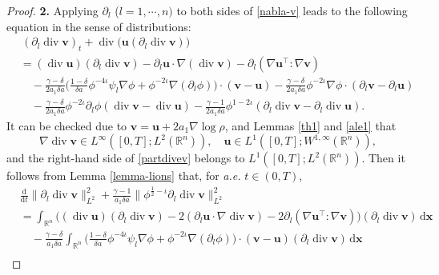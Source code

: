 \documentclass[11pt,reqno]{amsart}
\DeclareMathOperator{\diver}{\mathrm{div}}
\numberwithin{rk}{section}
\numberwithin{prop}{section}
\numberwithin{mydef}{section}
\numberwithin{lem}{section}
\numberwithin{equation}{section}
\numberwithin{thm}{section}
\begin{document}
\begin{proof}
\smallskip
\textbf{2.}
Applying $\partial_l$ ($l=1,\cdots\!,n)$ to both sides of \eqref{nabla-v} leads to the following equation in the sense of distributions:
\begin{equation}\label{partdivev}
\begin{aligned}
&\, (\partial_l\diver\boldsymbol{v})_t+\diver\big(\boldsymbol{u} (\partial_l\diver\boldsymbol{v})\big)\\
&=(\diver\boldsymbol{u})(\partial_l\diver\boldsymbol{v})-\partial_l\boldsymbol{u}\cdot \nabla(\diver\boldsymbol{v})-\partial_l(\nabla\boldsymbol{u}^\top:\nabla\boldsymbol{v})\\
&\quad -\frac{\gamma-\delta}{2a_1\delta a}\big(\frac{1-\delta}{\delta a}\phi^{-4\iota}\psi_l\nabla\phi+\phi^{-2\iota}\nabla(\partial_l\phi)\big)\cdot(\boldsymbol{v}-\boldsymbol{u})-\frac{\gamma-\delta}{2a_1\delta a}\phi^{-2\iota}\nabla\phi\cdot(\partial_l\boldsymbol{v}-\partial_l\boldsymbol{u})\\
&\quad  -\frac{\gamma-\delta}{2a_1\delta a} \phi^{-2\iota}\partial_l\phi(\diver\boldsymbol{v}-\diver\boldsymbol{u})-\frac{\gamma-1}{2a_1\delta a}\phi^{1-2\iota}(\partial_l\diver\boldsymbol{v}-\partial_l\diver\boldsymbol{u}).
\end{aligned}
\end{equation}
It can be checked due to $\boldsymbol{v}=\boldsymbol{u}+2a_1\nabla\log\rho$, and Lemmas \ref{th1} and \ref{ale1} that 
\begin{equation*}
\nabla\diver\boldsymbol{v}\in L^\infty([0,T];L^2(\mathbb{R}^n)),\quad \boldsymbol{u}\in L^1([0,T];W^{1,\infty}(\mathbb{R}^n)),
\end{equation*}
and the right-hand side of \eqref{partdivev} belongs to $L^1([0,T];L^2(\mathbb{R}^n))$.
Then it follows from Lemma \ref{lemma-lions} that, for {\it a.e.} $t\in (0,T)$, 
\begin{equation}
\begin{aligned}
&\frac{\mathrm{d}}{\mathrm{d}t}\|\partial_l\diver\boldsymbol{v}\|_{L^2}^{2}+\frac{\gamma-1}{a_1\delta a}\big\|\phi^{\frac{1}{2}-\iota}\partial_l\diver\boldsymbol{v}\big\|_{L^2}^{2}\\
&=\int_{\mathbb{R}^n} \big( (\diver\boldsymbol{u}) (\partial_l\diver\boldsymbol{v}) -2 (\partial_l\boldsymbol{u}\cdot\nabla\diver\boldsymbol{v}) -2 \partial_l(\nabla\boldsymbol{u}^\top:\nabla\boldsymbol{v})\big)(\partial_l\diver\boldsymbol{v})\,\mathrm{d}\boldsymbol{x}\\
&\quad- \frac{\gamma-\delta}{a_1\delta a}\int_{\mathbb{R}^n}\big(\frac{1-\delta}{\delta a}\phi^{-4\iota}\psi_l\nabla\phi+\phi^{-2\iota}\nabla(\partial_l\phi)\big)\cdot(\boldsymbol{v}-\boldsymbol{u})(\partial_l\diver\boldsymbol{v})\,\mathrm{d}\boldsymbol{x}\\

\end{aligned}
\end{equation}
\end{proof}
\end{document}
